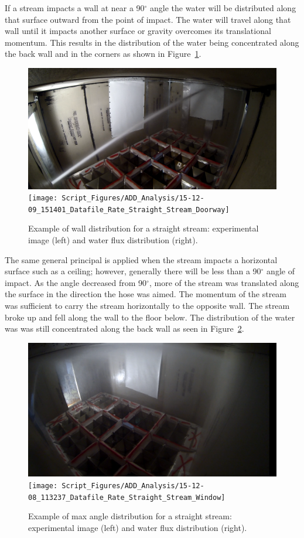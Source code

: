 \documentclass[12pt,oneside]{book}
\begin{document}
If a stream impacts a wall at near a 90$^{\circ}$ angle the water will be distributed along that surface outward from the point of impact. The water will travel along that wall until it impacts another surface or gravity overcomes its translational momentum. This results in the distribution of the water being concentrated along the back wall and in the corners as shown in Figure~\ref{fig:Doorway_Atwall_Example}.

\begin{figure}[!ht]
\centering
\includegraphics[height=0.25\textwidth]{Figures/Water_Distribution/Nozzle_Directions/Interior_MaxAngleWall_SS_Inside_2} 
\texttt{[image: Script\_Figures/ADD\_Analysis/15-12-09\_151401\_Datafile\_Rate\_Straight\_Stream\_Doorway]}
\caption[Example of At Wall Distribution]{Example of wall distribution for a straight stream: experimental image (left) and water flux distribution (right).}
\label{fig:Doorway_Atwall_Example}
\end{figure}

The same general principal is applied when the stream impacts a horizontal surface such as a ceiling; however, generally there will be less than a 90$^{\circ}$ angle of impact. As the angle decreased from 90$^{\circ}$, more of the stream was translated along the surface in the direction the hose was aimed. The momentum of the stream was sufficient to carry the stream horizontally to the opposite wall. The stream broke up and fell along the wall to the floor below. The distribution of the water was was still concentrated along the back wall as seen in Figure~\ref{fig:MaxAngle_Window}.

\begin{figure}[!ht]
\centering
\includegraphics[height=0.25\textwidth]{Figures/Water_Distribution/Nozzle_Directions/Exterior_MaxAngleCeiling_SS} 
\texttt{[image: Script\_Figures/ADD\_Analysis/15-12-08\_113237\_Datafile\_Rate\_Straight\_Stream\_Window]}
\caption[Example of Max Angle Distribution]{Example of max angle distribution for a straight stream: experimental image (left) and water flux distribution (right).}
\label{fig:MaxAngle_Window}
\end{figure}
\end{document}
